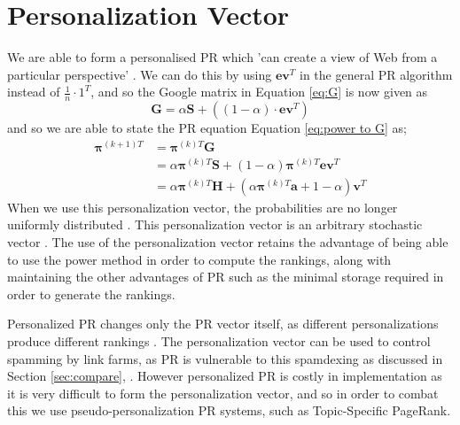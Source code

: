 \section{Personalization Vector} \label{sec:Personalization}
We are able to form a personalised PR which 'can create a view of Web from a particular perspective' \cite{page1999pagerank}. We can do this by using $\textbf{ev}^T$ in the general PR algorithm instead of $\frac{1}{n}\cdot1^T$, and so the Google matrix in Equation \eqref{eq:G} is now given as \begin{equation}\label{eq:Personalisation G}
\textbf{G}=\alpha\textbf{S}+\left((1-\alpha)\cdot\textbf{ev}^T\right)
\end{equation} and so we are able to state the PR equation Equation \eqref{eq:power to G} as; 
\begin{align}
\boldsymbol{\pi}^{(k+1)T} &= \boldsymbol{\pi}^{(k)T}\textbf{G} \nonumber \\
&= \alpha\boldsymbol{\pi}^{(k)T}\textbf{S} + (1-\alpha)\boldsymbol{\pi}^{(k)T}\textbf{ev}^T \nonumber \\
&= \alpha\boldsymbol{\pi}^{(k)T}\textbf{H} + \left(\alpha\boldsymbol{\pi}^{(k)T}\textbf{a} + 1 - \alpha\right)\textbf{v}^T \label{eq:Power personalization}
\end{align}
When we use this personalization vector, the probabilities are no longer uniformly distributed \cite{langville}. This personalization vector is an arbitrary stochastic vector \cite{bonato}. The use of the personalization vector retains the advantage of being able to use the power method in order to compute the rankings, along with maintaining the other advantages of PR such as the minimal storage required in order to generate the rankings.

Personalized PR changes only the PR vector itself, as different personalizations produce different rankings \cite{thorson2004modeling}. The personalization vector can be used to control spamming by link farms, as PR is vulnerable to this spamdexing as discussed in Section \ref{sec:compare}, \cite{thorson2004modeling}. However personalized PR is costly in implementation as it is very difficult to form the personalization vector, and so in order to combat this we use pseudo-personalization PR systems, such as Topic-Specific PageRank.